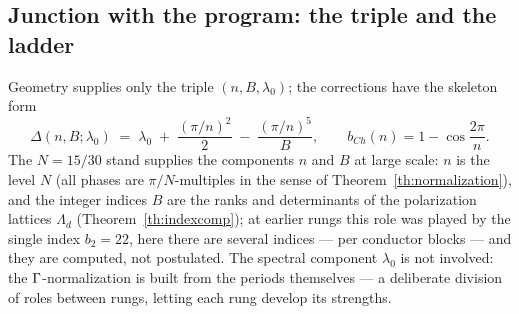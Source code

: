 \subsection{Junction with the program: the triple and the ladder}
\label{sec:repocycle}

Geometry supplies only the triple $(n,B,\lambda_0)$; the corrections
have the skeleton form
\[
  \Delta(n,B;\lambda_0) \;=\; \lambda_0
  \;+\;\frac{(\pi/n)^2}{2}\;-\;\frac{(\pi/n)^5}{B},
  \qquad
  b_{Ch}(n)=1-\cos\frac{2\pi}{n}.
\]
The $N=15/30$ stand supplies the components $n$ and $B$ at large
scale: $n$ is the level $N$ (all phases are $\pi/N$-multiples in the
sense of Theorem~\ref{th:normalization}), and the integer indices
$B$ are the ranks and determinants of the polarization lattices
$\Lambda_d$ (Theorem~\ref{th:indexcomp}); at earlier rungs this role
was played by the single index $b_2=22$, here there are several
indices --- per conductor blocks --- and they are computed, not
postulated. The spectral component $\lambda_0$ is not involved: the
$\Gamma$-normalization is built from the periods themselves --- a
deliberate division of roles between rungs, letting each rung
develop its strengths.
